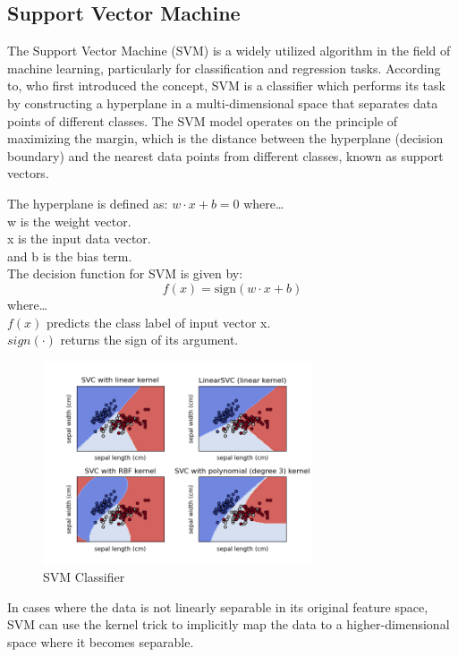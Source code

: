 \documentclass[12pt]{report}
\begin{document}
\subsection*{Support Vector Machine}
The Support Vector Machine (SVM) is a widely utilized algorithm in the field of
machine learning, particularly for classification and regression tasks.
According to\cite{Cortes1995}, who first introduced the concept, SVM is a
classifier which performs its task by constructing a hyperplane in a
multi-dimensional space that separates data points of different classes. The
SVM model operates on the principle of maximizing the margin, which is the
distance between the hyperplane (decision boundary) and the nearest data points
from different classes, known as support vectors.

The hyperplane is defined as: \( w \cdot x + b = 0 \) where\dots\\
w is the weight vector.\\ x is the input data vector.\\ and b is the bias term.\\

The decision function for SVM is given by: \[ f(x)=\mathrm{sign}(w \cdot x + b) \] where\dots \\
$f(x)$ predicts the class label of input vector x.\\ $sign(\cdot)$
returns the sign of its argument.\\

\begin{figure}[ht]
    \centering
    \includegraphics[width=8cm]{./figures/images (4).png}
    \caption{SVM Classifier}\label{fig:fig1}
\end{figure}

In cases where the data is not linearly separable in its original feature
space, SVM can use the kernel trick to implicitly map the data to a
higher-dimensional space where it becomes separable.
\end{document}
